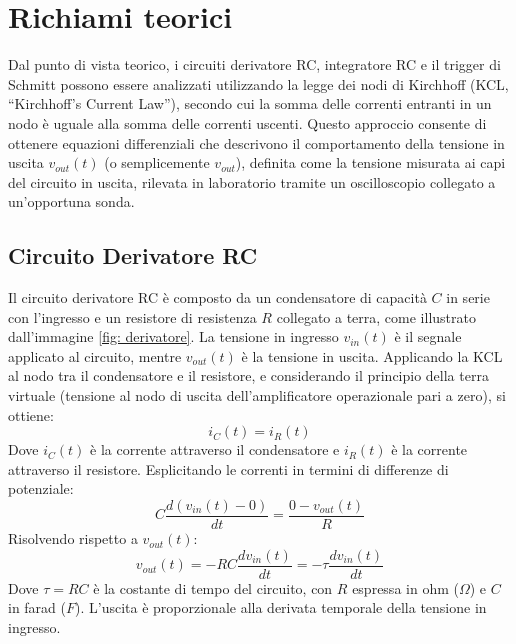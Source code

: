 \documentclass[a4paper,12pt]{article}
\begin{document}

\section{Richiami teorici}
Dal punto di vista teorico, i circuiti derivatore RC, integratore RC e il trigger di Schmitt possono essere analizzati utilizzando la legge dei nodi di Kirchhoff (KCL, ``Kirchhoff's Current Law''), secondo cui la somma delle correnti entranti in un nodo è uguale alla somma delle correnti uscenti. Questo approccio consente di ottenere equazioni differenziali che descrivono il comportamento della tensione in uscita \( v_{out}(t)\) (o semplicemente \(v_{out}\)), definita come la tensione misurata ai capi del circuito in uscita, rilevata in laboratorio tramite un oscilloscopio collegato a un’opportuna sonda.

\subsection{Circuito Derivatore RC}
Il circuito derivatore RC è composto da un condensatore di capacità \( C \) in serie con l’ingresso e un resistore di resistenza \( R \) collegato a terra, come illustrato dall'immagine \ref{fig: derivatore}. La tensione in ingresso \( v_{in}(t) \) è il segnale applicato al circuito, mentre \( v_{out}(t) \) è la tensione in uscita. Applicando la KCL al nodo tra il condensatore e il resistore, e considerando il principio della terra virtuale (tensione al nodo di uscita dell’amplificatore operazionale pari a zero), si ottiene:
\begin{equation}
    i_C(t) = i_R(t)
\end{equation}
Dove \( i_C(t) \) è la corrente attraverso il condensatore e \( i_R(t) \) è la corrente attraverso il resistore. Esplicitando le correnti in termini di differenze di potenziale:
\begin{equation}
    C \frac{d(v_{in}(t) - 0)}{dt} = \frac{0 - v_{out}(t)}{R}
\end{equation}
Risolvendo rispetto a \( v_{out}(t) \):
\begin{equation}
    \label{derivatore}
    v_{out}(t) = -RC \frac{d v_{in}(t)}{dt} = -\tau \frac{d v_{in}(t)}{dt}
\end{equation}
Dove \( \tau = RC \) è la costante di tempo del circuito, con \( R \) espressa in ohm (\( \Omega \)) e \( C \) in farad (\( F \)). L’uscita è proporzionale alla derivata temporale della tensione in ingresso.
\end{document}
